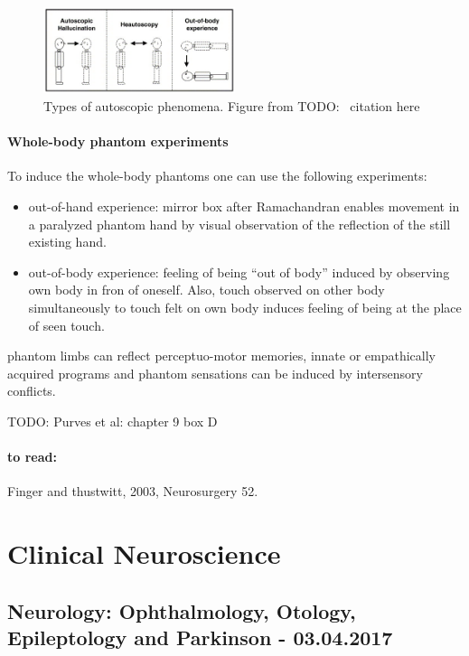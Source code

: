 \documentclass[12pt,article,oneside,a4paper]{memoir}
\begin{document}
\begin{figure}[h]
  \centering
  \includegraphics[width=0.5\textwidth]{imgs/autoscopic-phenomena.png}
  \caption{Types of autoscopic phenomena. Figure from TODO: ~citation here~ }
  \label{fig:autoscopic-phenomena}
\end{figure}

\paragraph{Whole-body phantom experiments}
To induce the whole-body phantoms one can use the following experiments:
\begin{itemize}
\item out-of-hand experience: mirror box after Ramachandran enables movement in a paralyzed phantom hand by visual observation of the reflection of the still existing hand.
\item out-of-body experience: feeling of being ``out of body'' induced by observing own body in fron of oneself. Also, touch observed on other body simultaneously to touch felt on own body induces feeling of being at the place of seen touch.
\end{itemize}

phantom limbs can reflect perceptuo-motor memories, innate or empathically acquired programs and phantom sensations can be induced by intersensory conflicts.

TODO: Purves et al: chapter 9 box D
\paragraph{to read:} Finger and thustwitt, 2003, Neurosurgery 52.

\newpage
\section{Clinical Neuroscience}

\subsection{Neurology: Ophthalmology, Otology, Epileptology and Parkinson - 03.04.2017}
\end{document}
